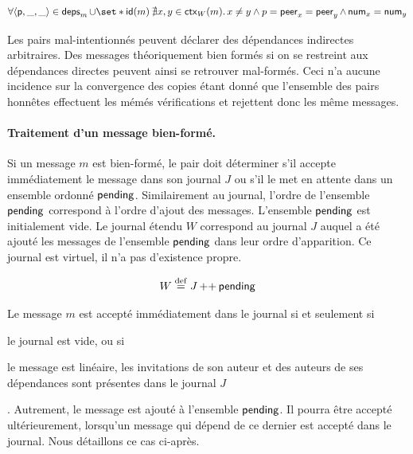 \begin{equation}\label{eq:honest-verif}
    \forall \tuple*{\trm{p}, \_, \_} \in \trm{deps}_m \cup \set*{\trm{id}(m)} \:\nexists x, y \in \trm{ctx}_W(m) \qsep x \neq y \land p = \trm{peer}_x = \trm{peer}_y \land \trm{num}_x = \trm{num}_y
\end{equation}

\begin{remark}
Les pairs mal-intentionnés peuvent déclarer des dépendances indirectes arbitraires.
Des messages théoriquement bien formés si on se restreint aux dépendances directes peuvent ainsi se retrouver mal-formés.
Ceci n'a aucune incidence sur la convergence des copies étant donné que l'ensemble des pairs honnêtes effectuent les mémés vérifications et rejettent donc les même messages.
\end{remark}


\paragraph{Traitement d'un message bien-formé.} Si un message $m$ est bien-formé, le pair doit déterminer s'il accepte immédiatement le message dans son journal $J$ ou s'il le met en attente dans un ensemble ordonné $\operatorname{\mathsf{pending}}$.
Similairement au journal, l'ordre de l'ensemble $\operatorname{\mathsf{pending}}$ correspond à l'ordre d'ajout des messages.
L'ensemble $\operatorname{\mathsf{pending}}$ est initialement vide.
Le journal étendu $W$ correspond au journal $J$ auquel a été ajouté les messages de l'ensemble $\operatorname{\mathsf{pending}}$ dans leur ordre d'apparition.
Ce journal est virtuel, il n'a pas d'existence propre.

\begin{equation*}
    W \overset{\mathrm{def}}{=} J \operatorname{++} \operatorname{\mathsf{pending}}
\end{equation*}

Le message $m$ est accepté immédiatement dans le journal si et seulement si \begin{inlinelist}\item le journal est vide, ou si \item le message est linéaire, les invitations de son auteur et des auteurs de ses dépendances sont présentes dans le journal $J$\end{inlinelist}.
Autrement, le message est ajouté à l'ensemble $\operatorname{\mathsf{pending}}$.
Il pourra être accepté ultérieurement, lorsqu'un message qui dépend de ce dernier est accepté dans le journal.
Nous détaillons ce cas ci-après.

